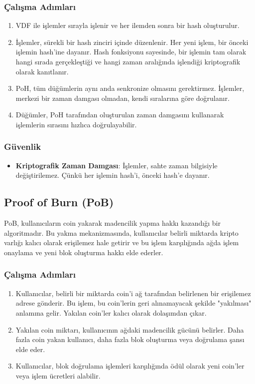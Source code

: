 \subsubsection{Çalışma Adımları}

\begin{enumerate}
    \item VDF ile işlemler sırayla işlenir ve her ilemden sonra bir hash oluşturulur.
    \item İşlemler, sürekli bir hash zinciri içinde düzenlenir. Her yeni işlem, bir önceki işlemin hash'ine dayanır. Hash fonksiyonu sayesinde, bir işlemin tam olarak hangi sırada gerçekleştiği ve hangi zaman aralığında işlendiği kriptografik olarak kanıtlanır.
    \item PoH, tüm düğümlerin aynı anda senkronize olmasını gerektirmez. İşlemler, merkezi bir zaman damgası olmadan, kendi sıralarına göre doğrulanır.
    \item Düğümler, PoH tarafından oluşturulan zaman damgasını kullanarak işlemlerin sırasını hızlıca doğrulayabilir.
\end{enumerate}

\subsubsection{Güvenlik}

\begin{itemize}
    \item \textbf{Kriptografik Zaman Damgası}: İşlemler, sahte zaman bilgisiyle değiştirilemez. Çünkü her işlemin hash'i, önceki hash'e dayanır.
\end{itemize}

\newpage

\subsection{Proof of Burn (PoB)}

PoB, kullanıcıların coin yakarak madencilik yapma hakkı kazandığı bir algoritmadır. Bu yakma mekanizmasında, kullanıcılar belirli miktarda kripto varlığı kalıcı olarak erişilemez hale getirir ve bu işlem karşılığında ağda işlem onaylama ve yeni blok oluşturma hakkı elde ederler.

\subsubsection{Çalışma Adımları}

\begin{enumerate}
    \item Kullanıcılar, belirli bir miktarda coin'i ağ tarafından belirlenen bir erişilemez adrese gönderir. Bu işlem, bu coin'lerin geri alınamayacak şekilde "yakılması" anlamına gelir. Yakılan coin'ler kalıcı olarak dolaşımdan çıkar.
    \item Yakılan coin miktarı, kullanıcının ağdaki madencilik gücünü belirler. Daha fazla coin yakan kullanıcı, daha fazla blok oluşturma veya doğrulama şansı elde eder.
    \item Kullanıcılar, blok doğrulama işlemleri karşılığında ödül olarak yeni coin'ler veya işlem ücretleri alabilir.
\end{enumerate}

